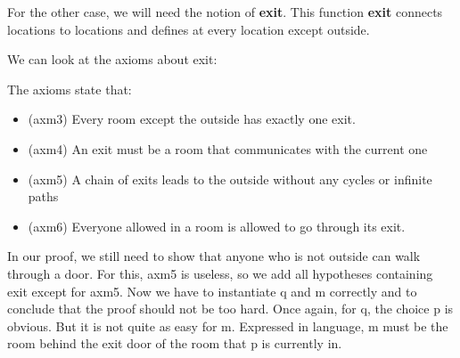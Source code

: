 For the other case, we will need the notion of \textbf{exit}. This function \textbf{exit} connects locations to locations and defines at every location except \textsf{outside}.

We can look at the axioms about \textsf{exit}:

\begin{description}
\AXIOMS
	\begin{description}
	\end{description}
\end{description}

The axioms state that:

\begin{itemize}
	\item (axm3) Every room except the outside has exactly one exit. 
	\item (axm4) An exit must be a room that communicates with the current one
	\item (axm5) A chain of exits leads to the outside without any cycles or infinite paths
	\item (axm6) Everyone allowed in a room is allowed to go through its exit. 
\end{itemize}  

In our proof, we still need to show that anyone who is not \textsf{outside} can walk through a door. For this, \textsf{axm5} is useless, so we add all hypotheses containing exit except for \textsf{axm5}. Now we have to instantiate \textsf{q} and \textsf{m} correctly and to conclude that the proof should not be too hard. Once again, for \textsf{q}, the choice \textsf{p} is obvious. But it is not quite as easy for \textsf{m}. Expressed in language, \textsf{m} must be the room behind the exit door of the room that \textsf{p} is currently in. 

